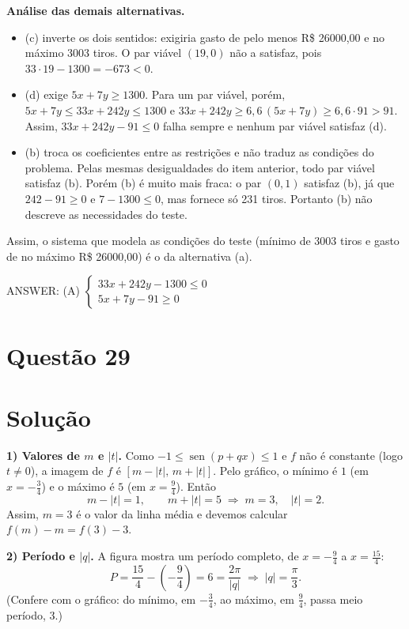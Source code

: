 \documentclass{article}%
\begin{document}
\textbf{Análise das demais alternativas.}
\begin{itemize}
\item (c) inverte os dois sentidos: exigiria gasto de pelo menos R\$ 26000,00 e no máximo 3003 tiros. O par viável $(19, 0)$ não a satisfaz, pois $33 \cdot 19 - 1300 = -673 < 0$.
\item (d) exige $5x + 7y \ge 1300$. Para um par viável, porém, $5x + 7y \le 33x + 242y \le 1300$ e $33x + 242y \ge 6{,}6\,(5x + 7y) \ge 6{,}6 \cdot 91 > 91$. Assim, $33x + 242y - 91 \le 0$ falha sempre e nenhum par viável satisfaz (d).
\item (b) troca os coeficientes entre as restrições e não traduz as condições do problema. Pelas mesmas desigualdades do item anterior, todo par viável satisfaz (b). Porém (b) é muito mais fraca: o par $(0, 1)$ satisfaz (b), já que $242 - 91 \ge 0$ e $7 - 1300 \le 0$, mas fornece só 231 tiros. Portanto (b) não descreve as necessidades do teste.
\end{itemize}

Assim, o sistema que modela as condições do teste (mínimo de 3003 tiros e gasto de no máximo R\$ 26000,00) é o da alternativa (a).

ANSWER: (A) $\begin{cases} 33x + 242y - 1300 \le 0 \\ 5x + 7y - 91 \ge 0 \end{cases}$%
\newpage%
\section*{Questão 29}

\section*{Solução}

\textbf{1) Valores de $m$ e $|t|$.} Como $-1 \le \operatorname{sen}(p+qx) \le 1$ e $f$ não é constante (logo $t \neq 0$), a imagem de $f$ é $[m-|t|,\, m+|t|]$. Pelo gráfico, o mínimo é $1$ (em $x=-\tfrac{3}{4}$) e o máximo é $5$ (em $x=\tfrac{9}{4}$). Então
\[
m-|t| = 1,\qquad m+|t| = 5 \;\Longrightarrow\; m = 3,\quad |t| = 2 .
\]
Assim, $m = 3$ é o valor da linha média e devemos calcular $f(m)-m = f(3)-3$.

\textbf{2) Período e $|q|$.} A figura mostra um período completo, de $x=-\tfrac{9}{4}$ a $x=\tfrac{15}{4}$:
\[
P = \frac{15}{4}-\left(-\frac{9}{4}\right) = 6 = \frac{2\pi}{|q|} \;\Longrightarrow\; |q| = \frac{\pi}{3}.
\]
(Confere com o gráfico: do mínimo, em $-\tfrac34$, ao máximo, em $\tfrac94$, passa meio período, $3$.)
\end{document}
